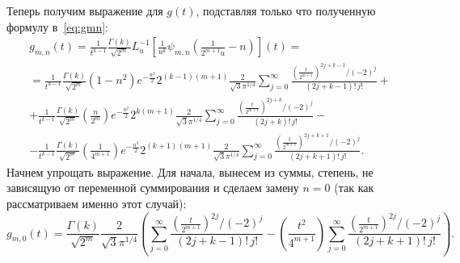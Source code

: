 \documentclass[12pt, a4paper]{report}
\begin{document}
Теперь получим выражение для $g(t)$, подставляя только что полученную формулу в~\ref{eq:gmn}:
\begin{multline*}
    g_{m,n}(t) = 
    \frac{1}{t^{k-1}} \frac{\Gamma(k)}{\sqrt{2^m}} L^{-1}_u \left[ \frac{1}{u^k} \psi_{m,n} \left( \frac{1}{2^{m+1} u} - n \right) \right] (t)
=\\=
    \frac{1}{t^{k-1}} \frac{\Gamma(k)}{\sqrt{2^m}} \left( 1-n^2 \right) 
    e^{-\frac{n^2}{2}} 2^{(k-1)(m+1)} \frac{2}{\sqrt{3} \pi^{1/4}}
    \sum_{j=0}^{\infty} \frac{\left(\frac{t}{2^{m+1}}\right)^{2j+k-1} / (-2)^j}{(2j+k-1)!\,j!}
+\\+
    \frac{1}{t^{k-1}} \frac{\Gamma(k)}{\sqrt{2^m}} \left( \frac{n}{2^m} \right) 
    e^{-\frac{n^2}{2}} 2^{k(m+1)} \frac{2}{\sqrt{3} \pi^{1/4}}
    \sum_{j=0}^{\infty} \frac{\left(\frac{t}{2^{m+1}}\right)^{2j+k} / (-2)^j}{(2j+k)!\,j!}
-\\-
    \frac{1}{t^{k-1}} \frac{\Gamma(k)}{\sqrt{2^m}} \left( \frac{1}{4^{m+1}} \right) 
    e^{-\frac{n^2}{2}} 2^{(k+1)(m+1)} \frac{2}{\sqrt{3} \pi^{1/4}}
    \sum_{j=0}^{\infty} \frac{\left(\frac{t}{2^{m+1}}\right)^{2j+k+1} / (-2)^j}{(2j+k+1)!\,j!}
.\end{multline*}
%
Начнем упрощать выражение. Для начала, вынесем из суммы, степень, не зависящую от переменной суммирования и сделаем замену $n=0$ (так как рассматриваем именно этот случай):
\[
    g_{m,0}(t) =
%
    \frac{\Gamma(k)}{\sqrt{2^m}}
    \frac{2}{\sqrt{3} \pi^{1/4}} \left(
%
    \sum_{j=0}^{\infty} \frac{\left(\frac{t}{2^{m+1}}\right)^{2j} / (-2)^j}{(2j+k-1)!\,j!}
-
    \left( \frac{t^2}{4^{m+1}} \right) 
    \sum_{j=0}^{\infty} \frac{\left(\frac{t}{2^{m+1}}\right)^{2j} / (-2)^j}{(2j+k+1)!\,j!}
%
    \right)
.\]
\end{document}
